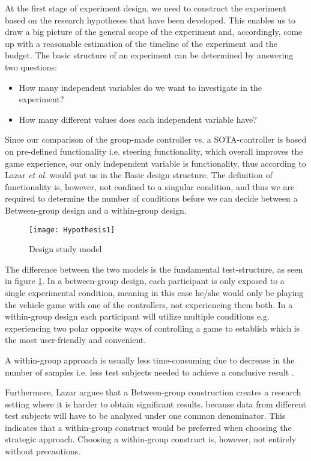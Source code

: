 At the first stage of experiment design, we need to construct the experiment based on the research hypotheses that have been developed. This enables us to draw a big picture of the general scope of the experiment and, accordingly, come up with a reasonable estimation of the timeline of the experiment and the budget. The basic structure of an experiment can be determined by answering two questions:

\begin{itemize}
	\item How many independent variables do we want to investigate in the experiment?
	\item How many different values does each independent variable have?
\end{itemize}
\parencite{Lazar2010}
\bigskip

Since our comparison of the group-made controller vs. a SOTA-controller is based on pre-defined functionality i.e. steering functionality, which overall improves the game experience, our only independent variable is functionality, thus according to Lazar \textit{et al}. would put us in the Basic design structure. The definition of functionality is, however, not confined to a singular condition, and thus we are required to determine the number of conditions before we can decide between a Between-group design and a within-group design.	

\begin{figure}[!htbp]
\centering
\texttt{[image: Hypothesis1]}
\caption{Design study model}
\label{fig:designstudy}
\end{figure}

The difference between the two models is the fundamental test-structure, as seen in figure \ref{fig:designstudy}. In a between-group design, each participant is only exposed to a single experimental condition, meaning in this case he/she would only be playing the vehicle game with one of the controllers, not experiencing them both. In a within-group design each participant will utilize multiple conditions e.g. experiencing two polar opposite ways of controlling a game to establish which is the most user-friendly and convenient.

A within-group approach is usually less time-consuming due to decrease in the number of samples i.e. less test subjects needed to achieve a conclusive result \parencite{Lazar2010}.

Furthermore, Lazar argues that a Between-group construction creates a research setting where it is harder to obtain significant results, because data from different test subjects will have to be analysed under one common denominator. This indicates that a within-group construct would be preferred when choosing the strategic approach. Choosing a within-group construct is, however, not entirely without precautions.
\bigskip

